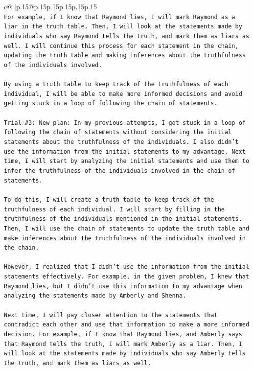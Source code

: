 \documentclass{article}
\begin{document}
{\begin{supertabular}{c@{$\;$}|p{.15\linewidth}@{}p{.15\linewidth}p{.15\linewidth}p{.15\linewidth}p{.15\linewidth}p{.15\linewidth}}
{{{\\ 
\texttt{For example, if I know that Raymond lies, I will mark Raymond as a liar in the truth table. Then, I will look at the statements made by individuals who say Raymond tells the truth, and mark them as liars as well. I will continue this process for each statement in the chain, updating the truth table and making inferences about the truthfulness of the individuals involved. } \\
\\ 
\texttt{By using a truth table to keep track of the truthfulness of each individual, I will be able to make more informed decisions and avoid getting stuck in a loop of following the chain of statements.} \\
\\ 
\texttt{Trial \#3: New plan: In my previous attempts, I got stuck in a loop of following the chain of statements without considering the initial statements about the truthfulness of the individuals. I also didn't use the information from the initial statements to my advantage. Next time, I will start by analyzing the initial statements and use them to infer the truthfulness of the individuals involved in the chain of statements. } \\
\\ 
\texttt{To do this, I will create a truth table to keep track of the truthfulness of each individual. I will start by filling in the truthfulness of the individuals mentioned in the initial statements. Then, I will use the chain of statements to update the truth table and make inferences about the truthfulness of the individuals involved in the chain. } \\
\\ 
\texttt{However, I realized that I didn't use the information from the initial statements effectively. For example, in the given problem, I knew that Raymond lies, but I didn't use this information to my advantage when analyzing the statements made by Amberly and Shenna. } \\
\\ 
\texttt{Next time, I will pay closer attention to the statements that contradict each other and use that information to make a more informed decision. For example, if I know that Raymond lies, and Amberly says that Raymond tells the truth, I will mark Amberly as a liar. Then, I will look at the statements made by individuals who say Amberly tells the truth, and mark them as liars as well. } \\
\\ 
}}}
\end{supertabular}}
\end{document}
